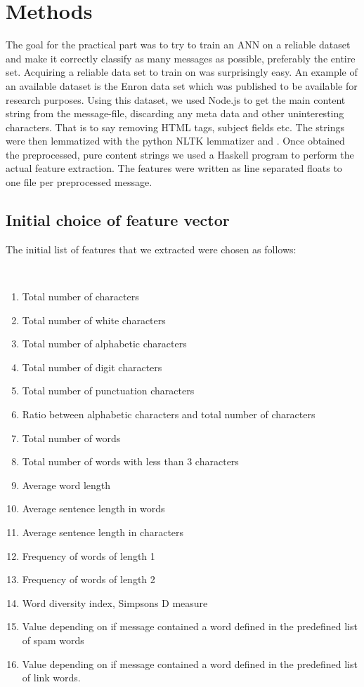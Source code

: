 
\section{Methods}
  
  The goal for the practical part was to try to train an ANN on a reliable
  dataset and make it correctly classify as many messages as possible,
  preferably the entire set.
  Acquiring a reliable data set to train on was surprisingly easy. An
  example of an available dataset is the Enron data set \cite{enron} which was
  published to be available for research purposes. Using this dataset, 
  we used Node.js to get the main content string from the
  message-file, discarding any meta data and other uninteresting characters.
  That is to say removing HTML tags, subject fields etc. The strings were then
  lemmatized with the python NLTK lemmatizer \cite{nltk} and
  \cite{bird2009natural}. Once obtained the preprocessed, pure content strings
  we used a Haskell program to perform the
  actual feature extraction. The features were written as line separated floats
  to one file per preprocessed message.
  \subsection{Initial choice of feature vector}
    The initial list of features that we extracted were chosen as follows:
    \begin{poem}\mbox{}\\[-\baselineskip]
      \begin{enumerate}
        \item Total number of characters
        \item Total number of white characters 
        \item Total number of alphabetic characters
        \item Total number of digit characters
        \item Total number of punctuation characters
        \item Ratio between alphabetic characters and total number of characters
        \item Total number of words
        \item Total number of words with less than 3 characters
        \item Average word length 
        \item Average sentence length in words
        \item Average sentence length in characters
        \item Frequency of words of length 1
        \item Frequency of words of length 2
        \item Word diversity index, Simpsons D measure \cite{simpsons-measure}
        \item Value depending on if message contained a word defined in the
          predefined list of spam words
        \item Value depending on if message contained a word defined in the 
          predefined list of link words.
      \end{enumerate}
    \end{poem} 

